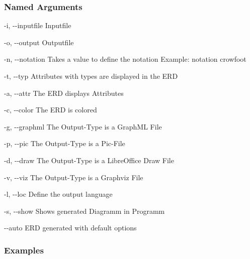 \documentclass[letterpaper,10pt,english,openany,oneside]{sphinxmanual}
\begin{document}
\subsubsection{Named Arguments}
\label{\detokenize{cmd_main:Named Arguments_repeat1}}\begin{optionlist}{3cm}
\item [-i, -{-}inputfile]  
Inputfile
\item [-o, -{-}output]  
Outputfile
\item [-n, -{-}notation]  
Takes a value to define the notation
Example: \textendash{}notation crowfoot
\item [-t, -{-}typ]  
Attributes with types are displayed in the ERD
\item [-a, -{-}attr]  
The ERD displays Attributes
\item [-c, -{-}color]  
The ERD is colored
\item [-g, -{-}graphml]  
The Output-Type is a GraphML File
\item [-p, -{-}pic]  
The Output-Type is a Pic-File
\item [-d, -{-}draw]  
The Output-Type is a LibreOffice Draw File
\item [-v, -{-}viz]  
The Output-Type is a Graphviz File
\item [-l, -{-}loc]  
Define the output language
\item [-s, -{-}show]  
Shows generated Diagramm in Programm
\item [-{-}auto]  
ERD generated with default options
\end{optionlist}

\subsubsection{Examples}
\begin{sphinxVerbatim}[commandchars=\\\{\}]
         
\end{sphinxVerbatim}

\begin{sphinxVerbatim}[commandchars=\\\{\}]
           
\end{sphinxVerbatim}
\end{document}
